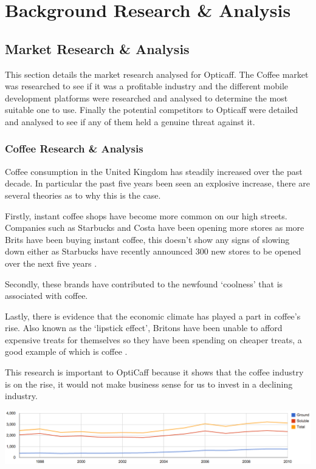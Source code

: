 \section{Background Research \& Analysis}

\subsection{Market Research \& Analysis}
This section details the market research analysed for Opticaff. The Coffee market was researched to see if it was a profitable industry and the different mobile development platforms were researched and analysed to determine the most suitable one to use. Finally the potential competitors to Opticaff were detailed and analysed to see if any of them held a genuine threat against it. 

\subsubsection{Coffee Research \& Analysis}
Coffee consumption in the United Kingdom has steadily increased over the past decade. In particular the past five years been seen an explosive increase, there are several theories as to why this is the case.

Firstly, instant coffee shops have become more common on our high streets. Companies such as Starbucks and Costa have been opening more stores as more Brits have been buying instant coffee, this doesn’t show any signs of slowing down either as Starbucks have recently announced 300 new stores to be opened over the next five years \cite{starbucks}.

Secondly, these brands have contributed to the newfound ‘coolness’ that is associated with coffee. 

Lastly, there is evidence that the economic climate has played a part in coffee’s rise. Also known as the ‘lipstick effect’, Britons have been unable to afford expensive treats for themselves so they have been spending on cheaper treats, a good example of which is coffee \cite{costa}.

This research is important to OptiCaff because it shows that the coffee industry is on the rise, it would not make business sense for us to invest in a declining industry.

\begin{center}
\includegraphics[trim = 0mm 0mm 0mm 0mm, clip, scale=0.4]{images/CaffeineGraph.png}
\end{center}

